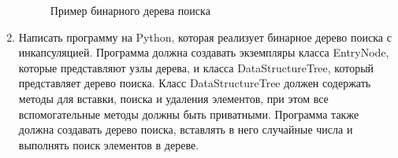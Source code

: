 \begin{enumerate}
\begin{figure}[h]
\centering
{}
\caption{Пример бинарного дерева поиска}
\end{figure}

\item Написать программу на Python, которая реализует бинарное дерево поиска с инкапсуляцией. Программа должна создавать экземпляры класса EntryNode, которые представляют узлы дерева, и класса DataStructureTree, который представляет дерево поиска. Класс DataStructureTree должен содержать методы для вставки, поиска и удаления элементов, при этом все вспомогательные методы должны быть приватными. Программа также должна создавать дерево поиска, вставлять в него случайные числа и выполнять поиск элементов в дереве.


\end{enumerate}
